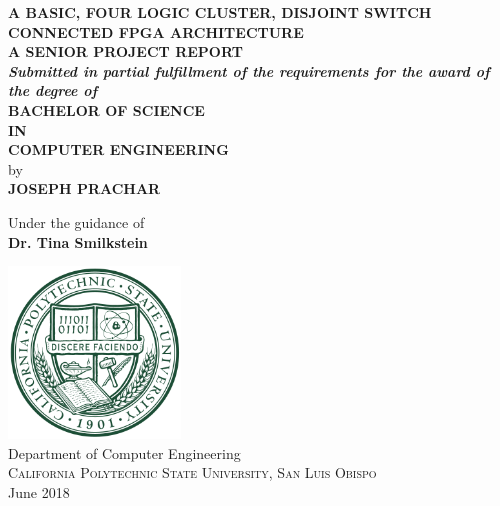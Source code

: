 \documentclass[12pt]{article}
\renewcommand{\baselinestretch}{1.5}
\begin{document}
\begin{titlepage}

\begin{center}

\renewcommand{\baselinestretch}{1.5}
\Large \textbf { A BASIC, FOUR LOGIC CLUSTER, DISJOINT SWITCH CONNECTED FPGA ARCHITECTURE }\\[0.8in]

\normalsize
\textbf{ A SENIOR PROJECT REPORT}\\[0.1in]
 \small
       \textit{\textbf{Submitted in partial fulfillment of
        the requirements for the award of the degree of}}\\[0.3in]
\normalsize
       \textbf{ BACHELOR OF SCIENCE \\IN\\ COMPUTER ENGINEERING}\\[0.5in]

 by \\
\textbf{ JOSEPH PRACHAR }

\vspace{.3in}
Under the guidance of\\
{\textbf{ Dr. Tina Smilkstein }}\\[0.1in]

\vfill

\includegraphics[height=1.8in]{logo}\\[0.1in]
{Department of Computer Engineering}\\
\normalsize
\textsc{ California Polytechnic State University, San Luis Obispo }\\
June 2018\\

\end{center}

\end{titlepage}
\end{document}
